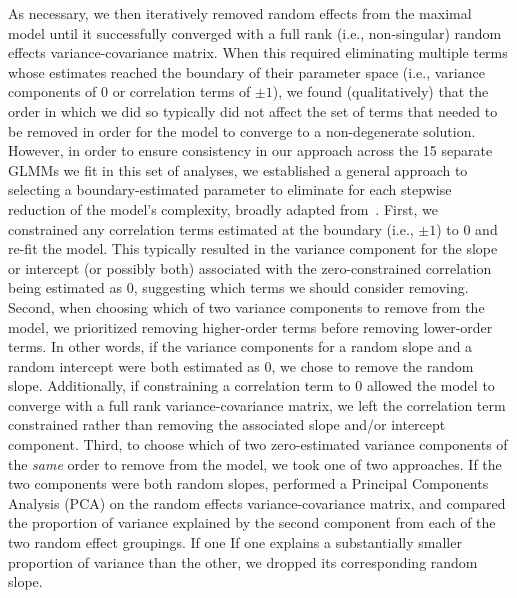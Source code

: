 \documentclass[10pt]{article}
\begin{document}
As necessary, we then iteratively removed random effects from the maximal model until it successfully converged with a full rank (i.e., non-singular) random effects variance-covariance matrix. 
When this required eliminating multiple terms whose estimates reached the boundary of their parameter space (i.e., variance components of 0 or correlation terms of  $\pm 1$), we found (qualitatively) that the order in which we did so typically did not affect the set of terms that needed to be removed in order for the model to converge to a non-degenerate solution.
However, in order to ensure consistency in our approach across the 15 separate GLMMs we fit in this set of analyses, we established a general approach to selecting a boundary-estimated parameter to eliminate for each stepwise reduction of the model's complexity, broadly adapted from~\citet{BateEtal15b}.
First, we constrained any correlation terms estimated at the boundary (i.e., $\pm 1$) to 0 and re-fit the model.
This typically resulted in the variance component for the slope or intercept (or possibly both) associated with the zero-constrained correlation being estimated as 0, suggesting which terms we should consider removing.
Second, when choosing which of two variance components to remove from the model, we prioritized removing higher-order terms before removing lower-order terms.
In other words, if the variance components for a random slope and a random intercept were both estimated as 0, we chose to remove the random slope.
Additionally, if constraining a correlation term to 0 allowed the model to converge with a full rank variance-covariance matrix, we left the correlation term constrained rather than removing the associated slope and/or intercept component.
Third, to choose which of two zero-estimated variance components of the \textit{same} order to remove from the model, we took one of two approaches.
If the two components were both random slopes, performed a Principal Components Analysis (PCA) on the random effects variance-covariance matrix, and compared the proportion of variance explained by the second component from each of the two random effect groupings. 
If one If one explains a substantially smaller proportion of variance than the other, we dropped its corresponding random slope.
\end{document}
